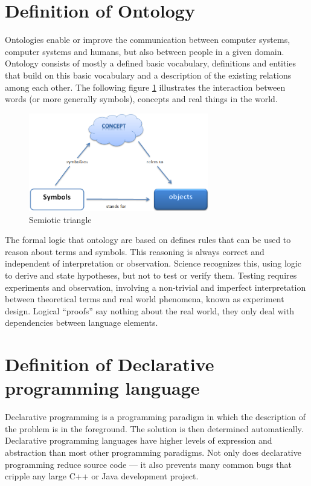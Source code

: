 \section{Definition of Ontology}\label{sec:app:ontology}
\par
Ontologies enable or improve the communication between computer systems, computer systems and humans, but also between people in a given domain. Ontology consists of mostly a defined basic vocabulary, definitions and entities that build on this basic vocabulary and a description of the existing relations among each other. The following figure \ref{fig:semiotic_triangle} illustrates the interaction between words (or more generally symbols), concepts and real things in the world. \autocite{appendix:ontology}
\begin{figure}[h]
	\centering
	\includegraphics[width=0.7\textwidth]{pics/appendix/onto.png}
	\caption{Semiotic triangle \label{fig:semiotic_triangle}}	
\end{figure}
\par
The formal logic that ontology are based on defines rules that can be used to reason about terms and symbols. This reasoning is always correct and independent of interpretation or observation. Science recognizes this, using logic to derive and state hypotheses, but not to test or verify them. Testing requires experiments and observation, involving a non-trivial and imperfect interpretation between theoretical terms and real world phenomena, known as experiment design. Logical “proofs” say nothing about the real world, they only deal with dependencies between language elements. \autocite{appendix:ontology}

\section{Definition of Declarative programming language}
\par
Declarative programming is a programming paradigm in which the description of the problem is in the foreground. The solution is then determined automatically. Declarative programming languages have higher levels of expression and abstraction than most other programming paradigms. Not only does declarative programming reduce source code — it also prevents many common bugs that cripple any large C++ or Java development project. \autocite{appendix:hawkins} 

